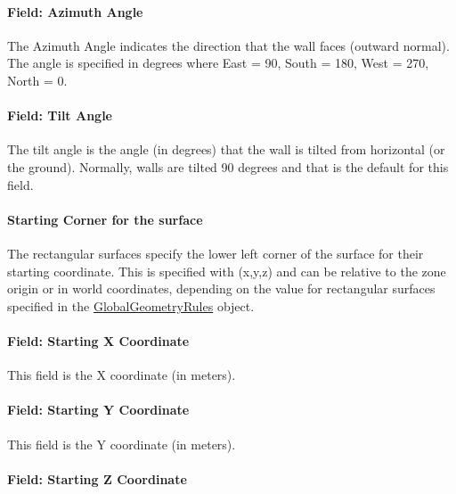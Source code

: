 \paragraph{Field: Azimuth Angle}\label{field-azimuth-angle-2}

The Azimuth Angle indicates the direction that the wall faces (outward normal). The angle is specified in degrees where East = 90, South = 180, West = 270, North = 0.

\paragraph{Field: Tilt Angle}\label{field-tilt-angle-2}

The tilt angle is the angle (in degrees) that the wall is tilted from horizontal (or the ground). Normally, walls are tilted 90 degrees and that is the default for this field.

\paragraph{Starting Corner for the surface}\label{starting-corner-for-the-surface-2}

The rectangular surfaces specify the lower left corner of the surface for their starting coordinate. This is specified with (x,y,z) and can be relative to the zone origin or in world coordinates, depending on the value for rectangular surfaces specified in the \hyperref[globalgeometryrules]{GlobalGeometryRules} object.

\paragraph{Field: Starting X Coordinate}\label{field-starting-x-coordinate-2}

This field is the X coordinate (in meters).

\paragraph{Field: Starting Y Coordinate}\label{field-starting-y-coordinate-2}

This field is the Y coordinate (in meters).

\paragraph{Field: Starting Z Coordinate}\label{field-starting-z-coordinate-2}


